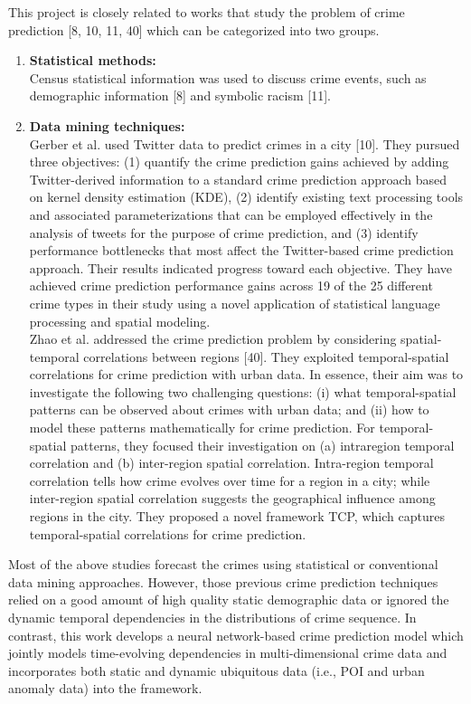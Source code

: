 This project is closely related to works that study the problem of crime prediction [8, 10, 11, 40] which can be categorized into two groups. 
\begin{enumerate}
    \item \textbf{Statistical methods:}\\[0.2cm]
    Census statistical information was used to discuss crime events, such as demographic information [8] and symbolic racism [11].\newpage
    
    \item \textbf{Data mining techniques:}\\[0.2cm]
    Gerber et al. used Twitter data to predict crimes in a city [10]. They pursued three objectives: (1) quantify the crime prediction gains achieved by adding Twitter-derived information to a standard crime prediction approach based on kernel density estimation (KDE), (2) identify existing text processing tools and associated parameterizations that can be employed effectively in the analysis of tweets for the purpose of crime prediction, and (3) identify performance bottlenecks that most affect the Twitter-based crime prediction approach. Their results indicated progress toward each objective. They have achieved crime prediction performance gains across 19 of the 25 different crime types in their study using a novel application of statistical language processing and spatial modeling.\\
    Zhao et al. addressed the crime prediction problem by considering spatial-temporal correlations between regions [40]. They exploited temporal-spatial correlations for crime
    prediction with urban data. In essence, their aim was to investigate the following two challenging questions: (i) what temporal-spatial patterns can be observed about crimes with urban data; and (ii) how to model these patterns mathematically for crime prediction. For temporal-spatial patterns, they focused their investigation on (a) intraregion temporal correlation and (b) inter-region spatial correlation. Intra-region temporal correlation tells how crime evolves over time for a region in a city; while inter-region spatial correlation suggests the geographical influence among regions in the city. They proposed a novel framework TCP, which captures temporal-spatial correlations for crime prediction.
\end{enumerate}

\noindent Most of the above studies forecast the crimes using statistical
or conventional data mining approaches. However, those previous
crime prediction techniques relied on a good amount of high quality
static demographic data or ignored the dynamic temporal dependencies in the distributions of crime sequence. In contrast, this work
develops a neural network-based crime prediction model which
jointly models time-evolving dependencies in multi-dimensional
crime data and incorporates both static and dynamic ubiquitous
data (i.e., POI and urban anomaly data) into the framework.

